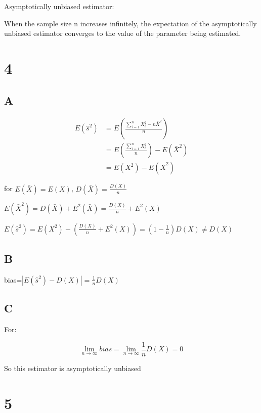 \documentclass{article}
\begin{document}
	Asymptotically unbiased estimator:
	
	When the sample size n increases infinitely, the expectation of the  asymptotically unbiased estimator converges to the value of the parameter being estimated.
	
	\section*{4}
	
	\subsection*{A}
	
	\begin{equation*}
		\begin{split}
		E(\hat{s}^2)&=E(\frac{\sum^n_{i=1}X_i^2-n\bar{X}^2}{n})\\
					&=E(\frac{\sum^n_{i=1}X_i^2}{n})-E(\bar{X}^2)\\
					&=E(X^2)-E(\bar{X}^2)
		\end{split}
	\end{equation*}
	
	for $E(\bar{X})=E(X)$, $D(\bar{X})=\frac{D(X)}{n}$
	
	$E(\bar{X}^2)=D(\bar{X})+E^2(\bar{X})=\frac{D(X)}{n}+E^2(X)$
	
	\hspace{\fill}
	
	$E(\hat{s}^2)=E(X^2)-(\frac{D(X)}{n}+E^2(X))=(1-\frac{1}{n})D(X)\ne D(X)$

	
	\subsection*{B}
	
	bias=$|E(\hat{s}^2)-D(X)|=\frac{1}{n}D(X)$
	
	\subsection*{C}
	
	For:
	
	\[
	\lim_{n\rightarrow\infty} bias=\lim_{n\rightarrow\infty}\frac{1}{n}D(X)=0
	\]
	
	So this estimator is asymptotically unbiased
	
	\newpage
	\section*{5}
	
\end{document}
